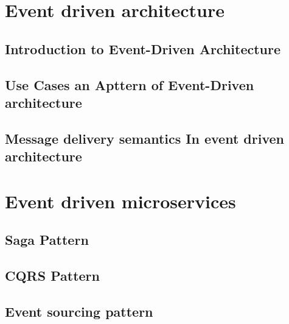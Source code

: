 \section{Event driven architecture}

\subsection{Introduction to Event-Driven Architecture}

\subsection{Use Cases an Apttern of Event-Driven architecture}

\subsection{Message delivery semantics In event driven architecture}

\section{Event driven microservices}

\subsection{Saga Pattern}

\subsection{CQRS Pattern}

\subsection{Event sourcing pattern}
